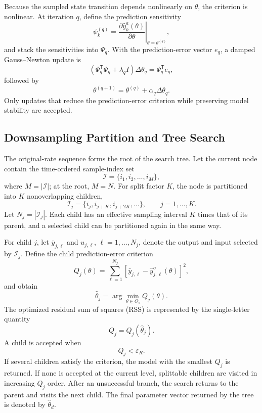 \documentclass[journal]{IEEEtran}
\begin{document}
Because the sampled state transition depends nonlinearly on $\theta$, the criterion is nonlinear. At iteration $q$, define the prediction sensitivity
\begin{equation}
\psi_k^{(q)}=\left.\frac{\partial \hat y_k^{a}(\theta)}{\partial\theta}\right|_{\theta=\theta^{(q)}},
\end{equation}
and stack the sensitivities into $\Psi_q$. With the prediction-error vector $e_q$, a damped Gauss--Newton update is
\begin{equation}
\left(\Psi_q^{\mathsf T}\Psi_q+\lambda_q I\right)\Delta\theta_q
=\Psi_q^{\mathsf T}e_q,
\end{equation}
followed by
\begin{equation}
\theta^{(q+1)}=\theta^{(q)}+\alpha_q\Delta\theta_q.
\end{equation}
Only updates that reduce the prediction-error criterion while preserving model stability are accepted.

\subsection{Downsampling Partition and Tree Search}
The original-rate sequence forms the root of the search tree. Let the current node contain the time-ordered sample-index set
\begin{equation}
\mathcal I=\{i_1,i_2,\ldots,i_M\},
\end{equation}
where $M=|\mathcal I|$; at the root, $M=N$. For split factor $K$, the node is partitioned into $K$ nonoverlapping children,
\begin{equation}
\mathcal I_j=\{i_j,i_{j+K},i_{j+2K},\ldots\},\qquad j=1,\ldots,K.
\end{equation}
Let $N_j=|\mathcal I_j|$. Each child has an effective sampling interval $K$ times that of its parent, and a selected child can be partitioned again in the same way.

For child $j$, let $\bar y_{j,\ell}$ and $u_{j,\ell}$, $\ell=1,\ldots,N_j$, denote the output and input selected by $\mathcal I_j$. Define the child prediction-error criterion
\begin{equation}
Q_j(\theta)=\sum_{\ell=1}^{N_j}\left[\bar y_{j,\ell}-\hat y_{j,\ell}^{o}(\theta)\right]^2,
\end{equation}
and obtain
\begin{equation}
\hat\theta_j=\arg\min_{\theta\in\Theta_s}Q_j(\theta).
\end{equation}
The optimized residual sum of squares (RSS) is represented by the single-letter quantity
\begin{equation}
Q_j=Q_j(\hat\theta_j).
\end{equation}
A child is accepted when
\begin{equation}
Q_j<\varepsilon_R.
\end{equation}
If several children satisfy the criterion, the model with the smallest $Q_j$ is returned. If none is accepted at the current level, splittable children are visited in increasing $Q_j$ order. After an unsuccessful branch, the search returns to the parent and visits the next child. The final parameter vector returned by the tree is denoted by $\hat\theta_d$.
\end{document}
